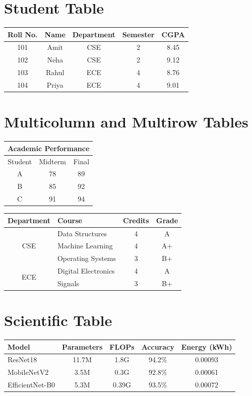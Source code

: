 \documentclass[10pt,a4paper]{article}
\begin{document}
\section*{Student Table}
\begin{center}
\begin{tabular}{|c|c|c|c|c|}\hline
\textbf{Roll No.}&\textbf{Name}&\textbf{Department}&\textbf{Semester}&\textbf{CGPA}\\\hline
101&Amit&CSE&2&8.45\\\hline 102&Neha&CSE&2&9.12\\\hline
103&Rahul&ECE&4&8.76\\\hline 104&Priya&ECE&4&9.01\\\hline
\end{tabular}
\end{center}
\section*{Multicolumn and Multirow Tables}
\begin{center}
\begin{tabular}{|c|c|c|}\hline
\multicolumn{3}{|c|}{\textbf{Academic Performance}}\\\hline
Student&Midterm&Final\\\hline A&78&89\\\hline B&85&92\\\hline C&91&94\\\hline
\end{tabular}

\medskip
\begin{tabular}{|c|l|c|c|}\hline
\textbf{Department}&\textbf{Course}&\textbf{Credits}&\textbf{Grade}\\\hline
\multirow{3}{*}{CSE}&Data Structures&4&A\\&Machine Learning&4&A+\\&Operating Systems&3&B+\\\hline
\multirow{2}{*}{ECE}&Digital Electronics&4&A\\&Signals&3&B+\\\hline
\end{tabular}
\end{center}
\section*{Scientific Table}
\begin{center}
\begin{tabular}{|l|c|c|c|c|}\hline
\rowcolor{gray!35}\textbf{Model}&\textbf{Parameters}&\textbf{FLOPs}&\textbf{Accuracy}&\textbf{Energy (kWh)}\\\hline
ResNet18&11.7M&1.8G&94.2\%&0.00093\\
MobileNetV2&3.5M&0.3G&92.8\%&0.00061\\
EfficientNet-B0&5.3M&0.39G&93.5\%&0.00072\\\hline
\end{tabular}
\end{center}
\end{document}
